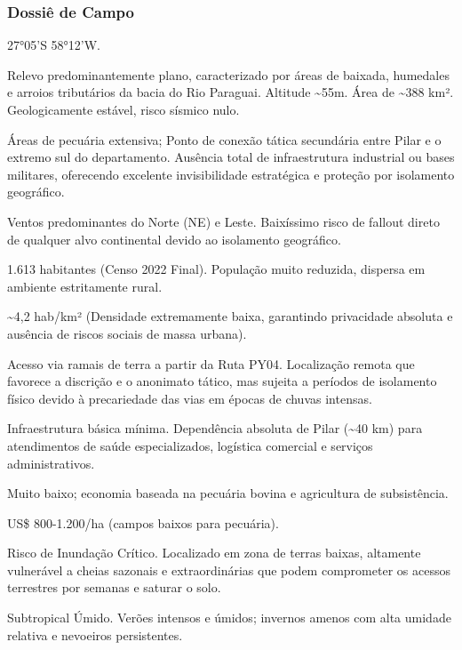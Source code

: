 \subsubsection{Dossiê de Campo}
\begin{description}[style=nextline,leftmargin=0.5cm,font=\bfseries]
\item[Coordenadas]  27°05'S 58°12'W.
\item[Topografia]  Relevo predominantemente plano, caracterizado por áreas de baixada, humedales e arroios tributários da bacia do Rio Paraguai. Altitude \textasciitilde 55m. Área de \textasciitilde 388 km². Geologicamente estável, risco sísmico nulo.
\item[Alvos Estratégicos]  Áreas de pecuária extensiva; Ponto de conexão tática secundária entre Pilar e o extremo sul do departamento. Ausência total de infraestrutura industrial ou bases militares, oferecendo excelente invisibilidade estratégica e proteção por isolamento geográfico.
\item[Fallout]  Ventos predominantes do Norte (NE) e Leste. Baixíssimo risco de fallout direto de qualquer alvo continental devido ao isolamento geográfico.
\item[População]  1.613 habitantes (Censo 2022 Final). População muito reduzida, dispersa em ambiente estritamente rural.
\item[Densidade]  \textasciitilde 4,2 hab/\allowbreak km² (Densidade extremamente baixa, garantindo privacidade absoluta e ausência de riscos sociais de massa urbana).
\item[Vias de Acesso]  Acesso via ramais de terra a partir da Ruta PY04. Localização remota que favorece a discrição e o anonimato tático, mas sujeita a períodos de isolamento físico devido à precariedade das vias em épocas de chuvas intensas.
\item[Serviços]  Infraestrutura básica mínima. Dependência absoluta de Pilar (\textasciitilde 40 km) para atendimentos de saúde especializados, logística comercial e serviços administrativos.
\item[Custo de Vida]  Muito baixo; economia baseada na pecuária bovina e agricultura de subsistência.
\item[Preço da Terra]  US\$ 800-1.200/\allowbreak ha (campos baixos para pecuária).
\item[Hidrologia]  Risco de Inundação Crítico. Localizado em zona de terras baixas, altamente vulnerável a cheias sazonais e extraordinárias que podem comprometer os acessos terrestres por semanas e saturar o solo.
\item[Clima]  Subtropical Úmido. Verões intensos e úmidos; invernos amenos com alta umidade relativa e nevoeiros persistentes.

\end{description}
